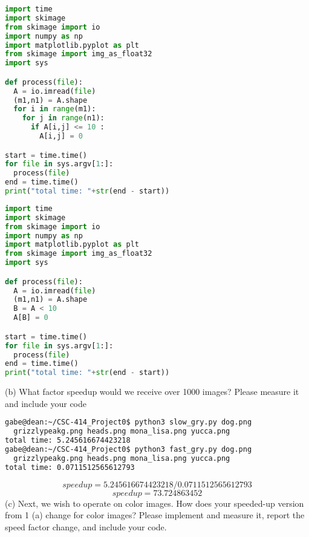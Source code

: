 \documentclass[12pt]{article}
\begin{document}
\begin{lstlisting}[frame=single,language=Python,caption=Slower For Loops with Greyscale Image\label{code:grayscale_slow}]
import time
import skimage
from skimage import io
import numpy as np
import matplotlib.pyplot as plt
from skimage import img_as_float32
import sys

def process(file):
  A = io.imread(file)
  (m1,n1) = A.shape
  for i in range(m1):
    for j in range(n1):
      if A[i,j] <= 10 :
        A[i,j] = 0

start = time.time()
for file in sys.argv[1:]:
  process(file)
end = time.time()
print("total time: "+str(end - start))
\end{lstlisting}
\newpage
\begin{lstlisting}[frame=single,language=Python,caption=Logical Indexing with Greyscale Image\label{code:grayscale_fast}]
import time
import skimage
from skimage import io
import numpy as np
import matplotlib.pyplot as plt
from skimage import img_as_float32
import sys

def process(file):
  A = io.imread(file)
  (m1,n1) = A.shape
  B = A < 10
  A[B] = 0

start = time.time()
for file in sys.argv[1:]:
  process(file)
end = time.time()
print("total time: "+str(end - start))
\end{lstlisting}

(b) What factor speedup would we receive over 1000 images? Please measure it
and include your code

\begin{lstlisting}[frame=single,language=Bash,caption=Command Line Performance Testing\label{code:performance_grayscale}]
gabe@dean:~/CSC-414_Project0$ python3 slow_gry.py dog.png 
  grizzlypeakg.png heads.png mona_lisa.png yucca.png 
total time: 5.245616674423218
gabe@dean:~/CSC-414_Project0$ python3 fast_gry.py dog.png 
  grizzlypeakg.png heads.png mona_lisa.png yucca.png 
total time: 0.0711512565612793
\end{lstlisting}
\[
  speedup = 5.245616674423218 / 0.0711512565612793
\]
\[
  speedup = 73.724863452
\]
\newpage
(c) Next, we wish to operate on color images. How does your speeded-up version
from 1 (a) change for color images? Please implement and measure it, report
the speed factor change, and include your code.
\end{document}
